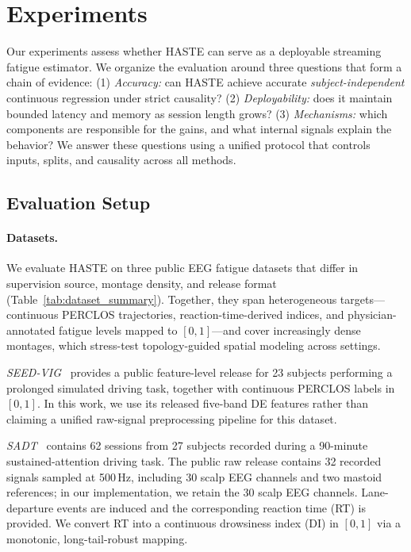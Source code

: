 \documentclass[preprint,12pt]{elsarticle}
\begin{document}
\section{Experiments}
\label{sec:experiments}


Our experiments assess whether HASTE can serve as a deployable streaming fatigue estimator.
We organize the evaluation around three questions that form a chain of evidence:
(1) \emph{Accuracy:} can HASTE achieve accurate \emph{subject-independent} continuous regression under strict causality?
(2) \emph{Deployability:} does it maintain bounded latency and memory as session length grows?
(3) \emph{Mechanisms:} which components are responsible for the gains, and what internal signals explain the behavior?
We answer these questions using a unified protocol that controls inputs, splits, and causality across all methods.

\subsection{Evaluation Setup}
\label{sec:exp_setup}

\paragraph{Datasets.}
We evaluate HASTE on three public EEG fatigue datasets that differ in supervision source, montage density, and release format (Table~\ref{tab:dataset_summary}). Together, they span heterogeneous targets---continuous PERCLOS trajectories, reaction-time-derived indices, and physician-annotated fatigue levels mapped to $[0,1]$---and cover increasingly dense montages, which stress-test topology-guided spatial modeling across settings.

\emph{SEED-VIG}~\cite{Zheng2017CriticalBands} provides a public feature-level release for 23 subjects performing a prolonged simulated driving task, together with continuous PERCLOS labels in $[0,1]$. In this work, we use its released five-band DE features rather than claiming a unified raw-signal preprocessing pipeline for this dataset.

\emph{SADT}~\cite{cao2019multi} contains 62 sessions from 27 subjects recorded during a 90-minute sustained-attention driving task. The public raw release contains 32 recorded signals sampled at 500\,Hz, including 30 scalp EEG channels and two mastoid references; in our implementation, we retain the 30 scalp EEG channels. Lane-departure events are induced and the corresponding reaction time (RT) is provided. We convert RT into a continuous drowsiness index (DI) in $[0,1]$ via a monotonic, long-tail-robust mapping.
\end{document}
